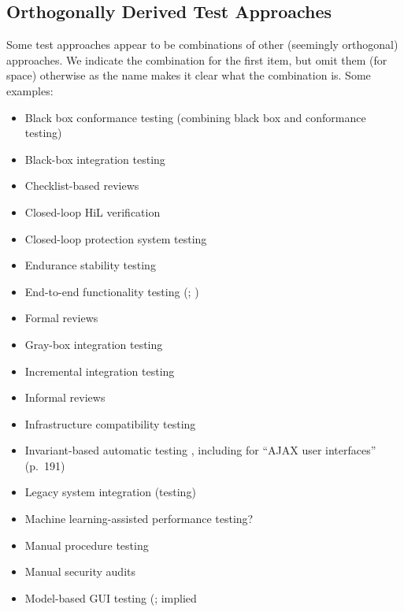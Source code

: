 \subsection{Orthogonally Derived Test Approaches}
\label{orthogonal-tests}
Some test approaches appear to be combinations of other (seemingly
orthogonal) approaches. We indicate the combination for the first item,
but omit them (for space) otherwise as the name makes it clear what the
combination is. Some examples:
\begin{itemize}
      \item Black box conformance testing \citep[p.~25]{JardEtAl1999}
        (combining black box and conformance testing)
      \item Black-box integration testing \citep[p.~345-346]{SakamotoEtAl2013}
      \item Checklist-based reviews \citepISTQB{}
      \item Closed-loop HiL verification \citep[p.~6]{PreußeEtAl2012}
      \item Closed-loop protection system testing \citep[p.~331]{ForsythEtAl2004}
      \item Endurance stability testing \citep[p.~55]{Firesmith2015}
      \item End-to-end functionality testing (\citealp[p.~20]{IEEE2021};
            \citealp[Tab.~2]{Gerrard2000a})
      \item Formal reviews \citepISTQB{}
      \item Gray-box integration testing \citep[p.~344]{SakamotoEtAl2013}
      \item Incremental integration testing \citep[p.~601]{SharmaEtAl2021}
      \item Informal reviews \citepISTQB{}
      \item Infrastructure compatibility testing \citep[p.~53]{Firesmith2015}
      \item Invariant-based automatic testing
            \citep[pp.~184-185,~Tab.~21]{DoğanEtAl2014}, including for
            ``AJAX user interfaces'' (p.~191)
      \item Legacy system integration (testing) \citep[Tab.~2]{Gerrard2000a}
      \item Machine learning-assisted performance testing? \citep{Moghadam2019}
      \item Manual procedure testing \citep[p.~47]{Firesmith2015}
      \item Manual security audits \citep[p.~28]{Gerrard2000b}
      \item Model-based GUI testing (\citealp[Tab.~1]{DoğanEtAl2014}; implied

\end{itemize}
